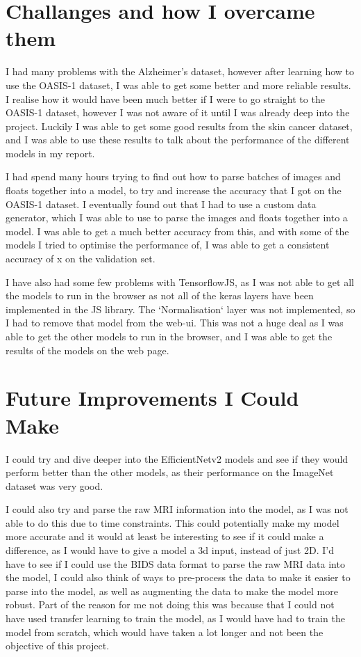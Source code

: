 \documentclass[]{final_report}
\begin{document}
\section{Challanges and how I overcame them}

I had many problems with the Alzheimer's dataset, however after learning how to use the OASIS-1 dataset, I was able to get some better and more reliable results. I realise how it would have been much better if I were to go straight to the OASIS-1 dataset, however I was not aware of it until I was already deep into the project. Luckily I was able to get some good results from the skin cancer dataset, and I was able to use these results to talk about the performance of the different models in my report.

I had spend many hours trying to find out how to parse batches of images and floats together into a model, to try and increase the accuracy that I got on the OASIS-1 dataset. I eventually found out that I had to use a custom data generator, which I was able to use to parse the images and floats together into a model. I was able to get a much better accuracy from this, and with some of the models I tried to optimise the performance of, I was able to get a consistent accuracy of x on the validation set.


I have also had some few problems with TensorflowJS\cite{tensorflowjs}, as I was not able to get all the models to run in the browser as not all of the keras layers have been implemented in the JS library. The `Normalisation` layer was not implemented, so I had to remove that model from the web-ui. This was not a huge deal as I was able to get the other models to run in the browser, and I was able to get the results of the models on the web page.

\section{Future Improvements I Could Make}

I could try and dive deeper into the EfficientNetv2 models and see if they would perform better than the other models, as their performance on the ImageNet\cite{ImageNet} dataset was very good. 

I could also try and parse the raw MRI information into the model, as I was not able to do this due to time constraints. This could potentially make my model more accurate and it would at least be interesting to see if it could make a difference, as I would have to give a model a 3d input, instead of just 2D. I'd have to see if I could use the BIDS data format to parse the raw MRI data into the model, I could also think of ways to pre-process the data to make it easier to parse into the model, as well as augmenting the data to make the model more robust. Part of the reason for me not doing this was because that I could not have used transfer learning to train the model, as I would have had to train the model from scratch, which would have taken a lot longer and not been the objective of this project.
\end{document}
